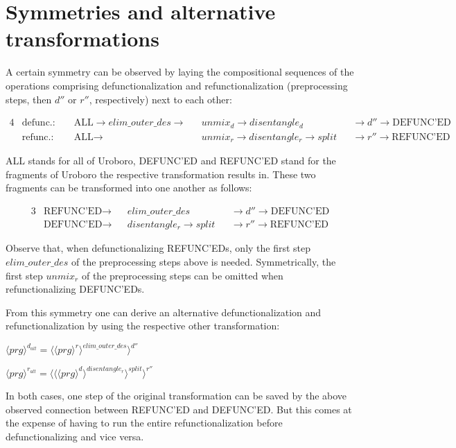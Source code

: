\documentclass[11pt]{article} %
\begin{document}
\section{Symmetries and alternative transformations}

A certain symmetry can be observed by laying the compositional sequences of the operations comprising defunctionalization and refunctionalization (preprocessing steps, then $d''$ or $r''$, respectively) next to each other:

\begin{alignat*}{4}
&\textrm{defunc.: } &&\textrm{ALL} \rightarrow  elim\_outer\_des \rightarrow && unmix_d \rightarrow disentangle_d && \rightarrow d'' \rightarrow \textrm{DEFUNC'ED} \\
&\textrm{refunc.: } &&\textrm{ALL} \rightarrow && unmix_r \rightarrow disentangle_r \rightarrow split && \rightarrow r'' \rightarrow \textrm{REFUNC'ED}
\end{alignat*}

ALL stands for all of Uroboro, DEFUNC'ED and REFUNC'ED stand for the fragments of Uroboro the respective transformation results in. These two fragments can be transformed into one another as follows:

\begin{alignat*}{3}
&\textrm{REFUNC'ED} \rightarrow && elim\_outer\_des &&\rightarrow d'' \rightarrow \textrm{DEFUNC'ED} \\
&\textrm{DEFUNC'ED} \rightarrow && disentangle_r \rightarrow split && \rightarrow r'' \rightarrow \textrm{REFUNC'ED}
\end{alignat*}

Observe that, when defunctionalizing REFUNC'EDs, only the first step $elim\_outer\_des$ of the preprocessing steps above is needed. Symmetrically, the first step $unmix_r$ of the preprocessing steps can be omitted when refunctionalizing DEFUNC'EDs.

From this symmetry one can derive an alternative defunctionalization and refunctionalization by using the respective other transformation:

$\langle prg \rangle^{d_{alt}} = \langle \langle prg \rangle^r \rangle^{elim\_outer\_des} \rangle^{d''}$

$\langle prg \rangle^{r_{alt}} = \langle \langle \langle prg \rangle^d \rangle^{disentangle_r} \rangle^{split} \rangle^{r''}$

In both cases, one step of the original transformation can be saved by the above observed connection between REFUNC'ED and DEFUNC'ED. But this comes at the expense of having to run the entire refunctionalization before defunctionalizing and vice versa.
\end{document}

